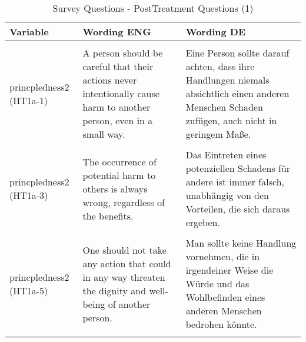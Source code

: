 \documentclass[]{article}
\begin{document}
\begin{table}[!h]

\caption{\label{tab:post}\label{tab:post1}Survey Questions - PostTreatment Questions (1)}
\centering
\begin{tabular}[t]{>{\raggedright\arraybackslash}p{3cm}>{\raggedright\arraybackslash}p{7cm}>{\raggedright\arraybackslash}p{7cm}}
\toprule
Variable & Wording ENG & Wording DE\\
\midrule
\cellcolor{gray!6}{princpledness2 (HT1a)} & \cellcolor{gray!6}{Below you will find a selection of general statements. We are interested in the extent to which you agree or disagree with the individual statements.} & \cellcolor{gray!6}{Im Folgenden finden Sie eine Auswahl an allgemeinen Aussagen. Uns interessiert, inwieweit Sie den einzelnen Aussagen zustimmen oder nicht zustimmen.}\\
princpledness2 (HT1a-1) & A person should be careful that their actions never intentionally cause harm to another person, even in a small way. & Eine Person sollte darauf achten, dass ihre Handlungen niemals absichtlich einen anderen Menschen Schaden zufügen, auch nicht in geringem Maße.\\
\cellcolor{gray!6}{princpledness2 (HT1a-2)} & \cellcolor{gray!6}{Putting others at risk should never be tolerated, no matter how small the risks.} & \cellcolor{gray!6}{Die Gefährdung anderer sollte niemals toleriert werden, unabhängig davon, wie gering die Risiken auch sein mögen.}\\
princpledness2 (HT1a-3) & The occurrence of potential harm to others is always wrong, regardless of the benefits. & Das Eintreten eines potenziellen Schadens für andere ist immer falsch, unabhängig von den Vorteilen, die sich daraus ergeben.\\
\cellcolor{gray!6}{princpledness2 (HT1a-4)} & \cellcolor{gray!6}{One should never hurt another person psychologically or physically.} & \cellcolor{gray!6}{Man sollte eine andere Person niemals psychisch oder physisch verletzen.}\\
\addlinespace
princpledness2 (HT1a-5) & One should not take any action that could in any way threaten the dignity and well-being of another person. & Man sollte keine Handlung vornehmen, die in irgendeiner Weise die Würde und das Wohlbefinden eines anderen Menschen bedrohen könnte.\\
\cellcolor{gray!6}{princpledness2 (HT1a-6)} & \cellcolor{gray!6}{If an act could harm an innocent third party, it should not be done.} & \cellcolor{gray!6}{Wenn eine Handlung einem unschuldigen Dritten schaden könnte, sollte sie nicht vorgenommen werden.}\\

\end{tabular}
\end{table}
\end{document}
